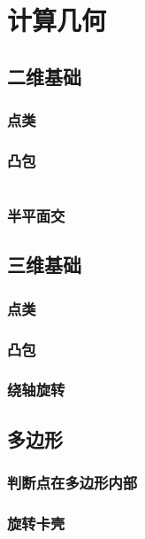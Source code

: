 \documentclass[a4paper]{article}
\newcommand{\cppcode}[1]{
    \inputminted[mathescape]{cpp}{source/#1}
}
\begin{document}
\section{计算几何}

\subsection{二维基础}

\subsubsection{点类}

\subsubsection{凸包}

\cppcode{computational-geometry/convex-hull.cpp}

\subsubsection{半平面交}

\subsection{三维基础}

\subsubsection{点类}

\subsubsection{凸包}

\subsubsection{绕轴旋转}

\subsection{多边形}

\subsubsection{判断点在多边形内部}

\subsubsection{旋转卡壳}
\end{document}
